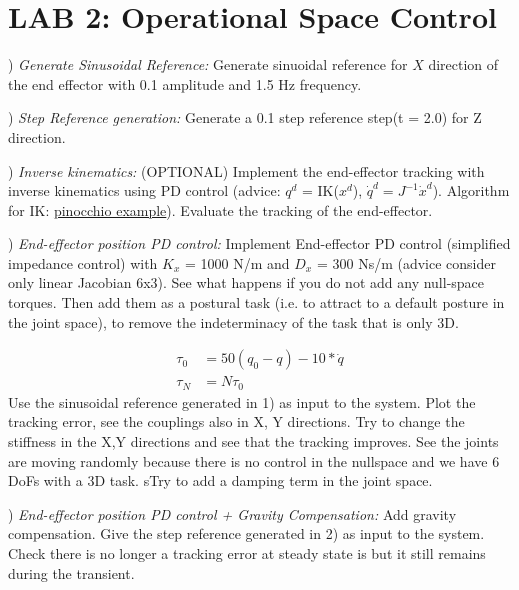 \documentclass{report}
\begin{document}
\section*{LAB 2: Operational Space Control	}

\quad

) \textit{Generate Sinusoidal Reference:}
Generate sinuoidal reference for $X$ direction of the end effector with 0.1 amplitude and 1.5 Hz frequency.

\quad

) \textit{Step Reference generation:}
Generate a 0.1 step reference step(t = 2.0) for Z direction.

\quad

) \textit{Inverse kinematics:} (OPTIONAL) Implement the end-effector tracking with inverse kinematics using PD control (advice: $q^d$ = IK($x^d$), $\dot{q}^d =  J^{-1} \dot{x}^d$). Algorithm for IK: \href{https://gepettoweb.laas.fr/doc/stack-of-tasks/pinocchio/master/doxygen-html/md_doc_b-examples_i-inverse-kinematics.html}{pinocchio example}). Evaluate the tracking of the end-effector.

\quad

)\textit{ End-effector position  PD control:}
Implement End-effector PD control (simplified impedance control) with $K_x$ = 1000 N/m and $D_x$ = 300 Ns/m (advice consider only linear Jacobian 6x3). 
See what happens if you do not add any null-space torques. Then add them as a postural task (i.e. to attract to a default posture in the joint space), to remove the indeterminacy of the task that is only 3D.


\begin{align}
  \tau_0& = 50(q_0-q) - 10*\dot{q}\\
\tau_N& = N \tau_0 
\label{fig:}
\end{align}
Use the sinusoidal reference generated in 1) as input to the system. Plot the tracking error, see the couplings also in X, Y directions. Try to change the stiffness in the X,Y directions and see that the tracking improves. See the joints are moving randomly because there is no control in the nullspace and we have 6 DoFs with a 3D task. sTry to add a damping term in the joint space.

\quad

) \textit{ End-effector position  PD control + Gravity Compensation:}
Add gravity compensation. Give the step reference generated in 2) as input to the system. Check there is no longer a  tracking error at steady state is  but it still remains during the transient. 
\end{document}
